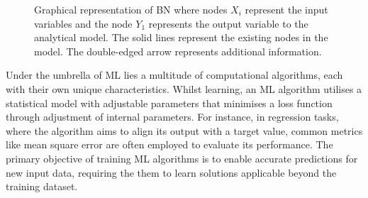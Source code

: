 \documentclass[journal]{IEEEtran}
\begin{document}
\begin{figure}[t]
    \caption{\small Graphical representation of BN where nodes $X_i$ represent the input variables and the node $Y_1$ represents the output variable to the analytical model. The solid lines represent the existing nodes in the model. The double-edged arrow represents additional information.}\label{fig:BN3} 
\end{figure}

Under the umbrella of ML lies a multitude of computational algorithms, each with their own unique characteristics. Whilst learning, an ML algorithm utilises a statistical model with adjustable parameters that minimises a loss function through adjustment of internal parameters. For instance, in regression tasks, where the algorithm aims to align its output with a target value, common metrics like mean square error are often employed to evaluate its performance. The primary objective of training ML algorithms is to enable accurate predictions for new input data, requiring the them to learn solutions applicable beyond the training dataset.
\end{document}
